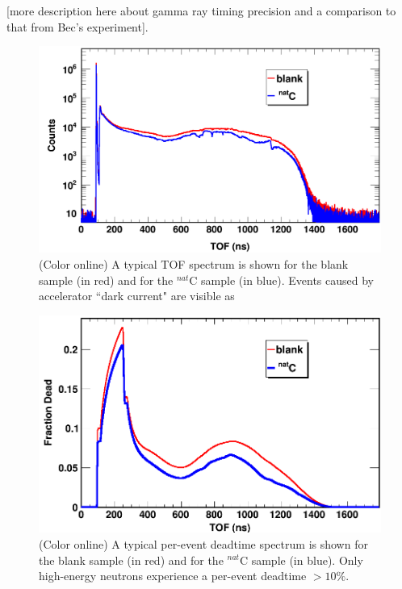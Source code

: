 \documentclass[twocolumn,secnumarabic,amssymb, nobibnotes, aps, prl,
superscriptaddress, nobalancelastpage]{revtex4}
\begin{document}
[more description here about gamma ray timing precision and a comparison to
that from Bec's experiment].

\begin{figure}
    \includegraphics[scale=0.24]{figures/exampleTOFSpectrum.png}
    \caption{(Color online) A typical TOF spectrum is shown for the blank sample (in
        red) and for the $^{nat}$C sample (in blue). Events caused by accelerator 
        ``dark current" are visible as 
    }
\end{figure}

\begin{figure}
    \includegraphics[scale=0.24]{figures/exampleDeadtimeSpectrum.png}
    \caption{(Color online) A typical per-event deadtime spectrum is shown for the 
        blank sample (in red) and for the $^{nat}$C sample (in blue). Only
        high-energy neutrons experience a per-event deadtime $>10\%$.
    }
    \label{DeadtimePlot}
\end{figure}
\end{document}
